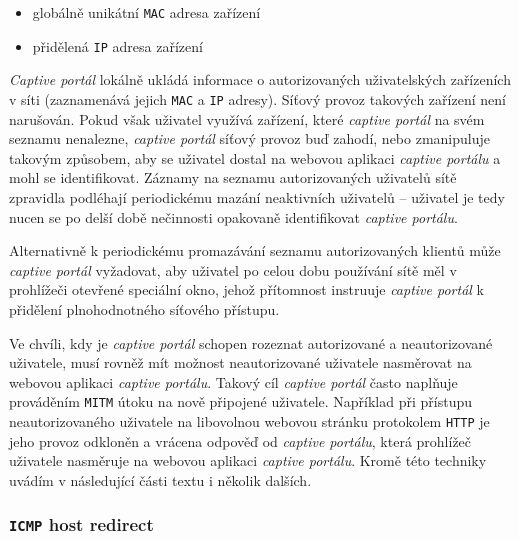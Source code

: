 \documentclass[thesis=M,czech]{FITthesis}[2012/10/20]
\begin{document}
\begin{itemize}
 \item globálně unikátní \texttt{MAC} adresa zařízení
 \item přidělená \texttt{IP} adresa zařízení
\end{itemize}

\textit{Captive portál} lokálně ukládá informace o autorizovaných uživatelských zařízeních v síti (zaznamenává jejich \texttt{MAC} a \texttt{IP} adresy). Síťový provoz takových zařízení není narušován. Pokud však uživatel využívá zařízení, které \textit{captive portál} na svém seznamu nenalezne, \textit{captive portál} síťový provoz buď zahodí, nebo zmanipuluje takovým způsobem, aby se uživatel dostal na webovou aplikaci \textit{captive portálu} a mohl se identifikovat. Záznamy na seznamu autorizovaných uživatelů sítě zpravidla podléhají periodickému mazání neaktivních uživatelů -- uživatel je tedy nucen se po delší době nečinnosti opakovaně identifikovat \textit{captive portálu}.

Alternativně k periodickému promazávání seznamu autorizovaných klientů může \textit{captive portál} vyžadovat, aby uživatel po celou dobu používání sítě měl v prohlížeči otevřené speciální okno, jehož přítomnost instruuje \textit{captive portál} k přidělení plnohodnotného síťového přístupu.

Ve chvíli, kdy je \textit{captive portál} schopen rozeznat autorizované a neautorizované uživatele, musí rovněž mít možnost neautorizované uživatele nasměrovat na webovou aplikaci \textit{captive portálu}. Takový cíl \textit{captive portál} často naplňuje prováděním \texttt{MITM} útoku na nově připojené uživatele. Například při přístupu neautorizovaného uživatele na libovolnou webovou stránku protokolem \texttt{HTTP} je jeho provoz odkloněn a vrácena odpověď od \textit{captive portálu}, která prohlížeč uživatele nasměruje na webovou aplikaci \textit{captive portálu}. Kromě této techniky uvádím v následující části textu i několik dalších.



\subsubsection{\texttt{ICMP} host redirect}
\end{document}
